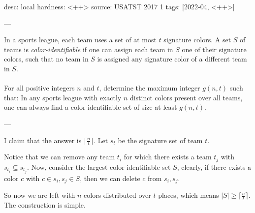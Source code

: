 desc: local
hardness: <++>
source: USATST 2017 1
tags: [2022-04, <++>]

---

In a sports league, each team uses a set of at most $t$ signature colors. A set $S$ of teams is\textit{ color-identifiable} if one can assign each team in $S$ one of their signature colors, such that no team in $S$ is assigned any signature color of a different team in $S$. \\\\
For all positive integers $n$ and $t$, determine the maximum integer $g(n, t)$ such that: In any sports league with exactly $n$ distinct colors present over all teams, one can always find a color-identifiable set of size at least $g(n, t)$.

---

I claim that the answer is $\lceil\frac{n}{t}\rceil$. 
Let $s_t$ be the signature set of team $t$. 

Notice that we can remove any team $t_i$ for which there exists a team
$t_j$ with $s_{t_i} \subseteq s_{t_j}$. Now,
consider the largest color-identifiable set $S$, clearly,
if there exists a color $c$ with $c \in s_i, s_j \in S$,
then we can delete $c$ from $s_i,s_j$.

So now we are left with $n$ colors distributed over $t$ places,
which means $|S| \geq \lceil\frac{n}{t}\rceil$. The construction 
is simple.
